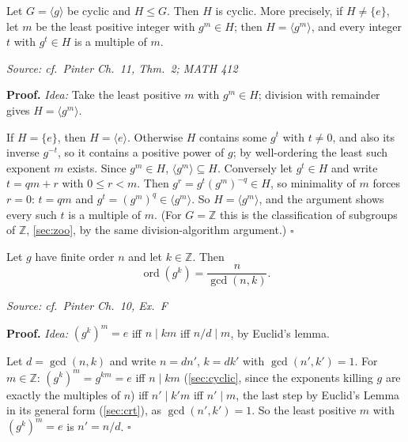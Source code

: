 \documentclass[11pt]{report}
\renewenvironment{proof}[1][Proof]{\noindent\textbf{#1.} }{\hfill$\square$\par\vspace{5pt}}
\newcommand{\srcline}[1]{\par\hfill{\footnotesize\textit{Source: #1}}}
\begin{document}
\begin{thmbox}\label{thm:subgroups-cyclic-groups-cyclic}
Let $G = \langle g \rangle$ be cyclic and $H \leq G$. Then $H$ is cyclic. More precisely, if $H \neq \{e\}$, let $m$ be the least positive integer with $g^m \in H$; then $H = \langle g^m \rangle$, and every integer $t$ with $g^t \in H$ is a multiple of $m$.
\srcline{cf.\ Pinter Ch.\ 11, Thm.\ 2; MATH 412}
\end{thmbox}

\begin{proof}
\textit{Idea:} Take the least positive $m$ with $g^m \in H$; division with remainder gives $H = \langle g^m \rangle$.\par
If $H = \{e\}$, then $H = \langle e \rangle$. Otherwise $H$ contains some $g^t$ with $t \neq 0$, and also its inverse $g^{-t}$, so it contains a positive power of $g$; by well-ordering the least such exponent $m$ exists. Since $g^m \in H$, $\langle g^m \rangle \subseteq H$. Conversely let $g^t \in H$ and write $t = qm + r$ with $0 \leq r < m$. Then $g^r = g^t (g^m)^{-q} \in H$, so minimality of $m$ forces $r = 0$: $t = qm$ and $g^t = (g^m)^q \in \langle g^m \rangle$. So $H = \langle g^m \rangle$, and the argument shows every such $t$ is a multiple of $m$. (For $G = \mathbb{Z}$ this is the classification of subgroups of $\mathbb{Z}$, \ref{sec:zoo}, by the same division-algorithm argument.)
\end{proof}

\begin{propbox}\label{prop:order-power}
Let $g$ have finite order $n$ and let $k \in \mathbb{Z}$. Then
\[ \operatorname{ord}(g^k) = \frac{n}{\gcd(n, k)}. \]
\srcline{cf.\ Pinter Ch.\ 10, Ex.\ F}
\end{propbox}

\begin{proof}
\textit{Idea:} $(g^k)^m = e$ iff $n \mid km$ iff $n/d \mid m$, by Euclid's lemma.\par
Let $d = \gcd(n, k)$ and write $n = dn'$, $k = dk'$ with $\gcd(n', k') = 1$. For $m \in \mathbb{Z}$: $(g^k)^m = g^{km} = e$ iff $n \mid km$ (\ref{sec:cyclic}, since the exponents killing $g$ are exactly the multiples of $n$) iff $n' \mid k'm$ iff $n' \mid m$, the last step by Euclid's Lemma in its general form (\ref{sec:crt}), as $\gcd(n', k') = 1$. So the least positive $m$ with $(g^k)^m = e$ is $n' = n/d$.
\end{proof}
\end{document}

